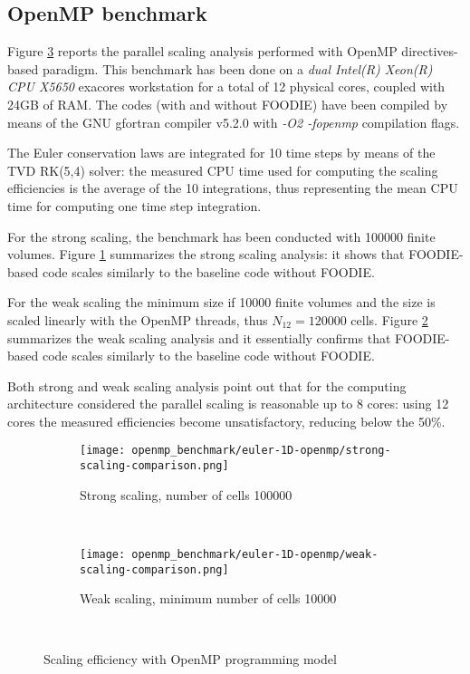 \subsection{OpenMP benchmark}\label{subsec:openmp}

Figure \ref{fig:scaling-openmp} reports the parallel scaling analysis performed with OpenMP directives-based paradigm. This benchmark has been done on a \emph{dual Intel(R) Xeon(R) CPU X5650} exacores workstation for a total of 12 physical cores, coupled with 24GB of RAM. The codes (with and without FOODIE) have been compiled by means of the GNU gfortran compiler v5.2.0 with \emph{-O2 -fopenmp} compilation flags.

The Euler conservation laws are integrated for 10 time steps by means of the TVD RK(5,4) solver: the measured CPU time used for computing the scaling efficiencies is the average of the 10 integrations, thus representing the mean CPU time for computing one time step integration.

For the strong scaling, the benchmark has been conducted with 100000 finite volumes. Figure \ref{fig:strong-scaling-openmp} summarizes the strong scaling analysis: it shows that FOODIE-based code scales similarly to the baseline code without FOODIE.

For the weak scaling the minimum size if 10000 finite volumes and the size is scaled linearly with the OpenMP threads, thus $N_{12} = 120000$ cells. Figure \ref{fig:weak-scaling-openmp} summarizes the weak scaling analysis and it essentially confirms that FOODIE-based code scales similarly to the baseline code without FOODIE.

Both strong and weak scaling analysis point out that for the computing architecture considered the parallel scaling is reasonable up to 8 cores: using 12 cores the measured efficiencies become unsatisfactory, reducing below the 50\%.
\begin{figure}[!ht]
  \centering
  \begin{subfigure}[b]{0.95\textwidth}
    \centering
    \texttt{[image: openmp\_benchmark/euler-1D-openmp/strong-scaling-comparison.png]}
    \caption{Strong scaling, number of cells 100000}\label{fig:strong-scaling-openmp}
  \end{subfigure}\\
  \begin{subfigure}[b]{0.95\textwidth}
    \centering
    \texttt{[image: openmp\_benchmark/euler-1D-openmp/weak-scaling-comparison.png]}
    \caption{Weak scaling, minimum number of cells 10000}\label{fig:weak-scaling-openmp}
  \end{subfigure}\\
  \caption{Scaling efficiency with OpenMP programming model}\label{fig:scaling-openmp}
\end{figure}

